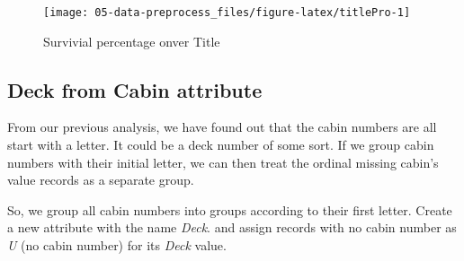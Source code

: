 \documentclass[
]{book}
\newenvironment{Shaded}{\begin{snugshade}}{\end{snugshade}}
\newcommand{\DataTypeTok}[1]{\textcolor[rgb]{0.13,0.29,0.53}{#1}}
\newcommand{\DecValTok}[1]{\textcolor[rgb]{0.00,0.00,0.81}{#1}}
\newcommand{\FloatTok}[1]{\textcolor[rgb]{0.00,0.00,0.81}{#1}}
\newcommand{\KeywordTok}[1]{\textcolor[rgb]{0.13,0.29,0.53}{\textbf{#1}}}
\newcommand{\NormalTok}[1]{#1}
\newcommand{\OperatorTok}[1]{\textcolor[rgb]{0.81,0.36,0.00}{\textbf{#1}}}
\newcommand{\StringTok}[1]{\textcolor[rgb]{0.31,0.60,0.02}{#1}}
\begin{document}
\begin{Shaded}
\end{Shaded}

\begin{figure}

{\centering \texttt{[image: 05-data-preprocess\_files/figure-latex/titlePro-1]} 

}

\caption{Survivial percentage onver Title}\label{fig:titlePro}
\end{figure}

\hypertarget{deck-from-cabin-attribute}{%
\subsection*{Deck from Cabin attribute}\label{deck-from-cabin-attribute}}


From our previous analysis, we have found out that the cabin numbers are all start with a letter. It could be a deck number of some sort. If we group cabin numbers with their initial letter, we can then treat the ordinal missing cabin's value records as a separate group.

So, we group all cabin numbers into groups according to their first letter. Create a new attribute with the name \emph{Deck}. and assign records with no cabin number as \emph{U} (no cabin number) for its \emph{Deck} value.
\end{document}
